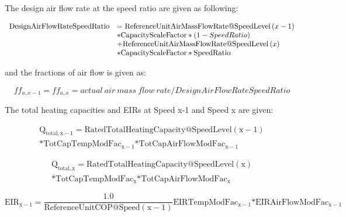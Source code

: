 The design air flow rate at the speed ratio are given as following:

\begin{equation}
  \begin{array}{rl}
    \mathrm{DesignAirFlowRateSpeedRatio} &= \mathrm{ReferenceUnitAirMassFlowRate @ SpeedLevel} \left(x-1\right) \\
                                     &* \mathrm{CapacityScaleFactor} * \left(1 - SpeedRatio\right) \\
                                     &+ \mathrm{ReferenceUnitAirMassFlowRate @ SpeedLevel} \left(x\right) \\
                                     &* \mathrm{CapacityScaleFactor*SpeedRatio}
  \end{array}
\end{equation}

and the fractions of air flow is given as:

\begin{equation}
ff_{a,x-1} = ff_{a,x} = actual~air~mass~flow~rate/DesignAirFlowRateSpeedRatio
\end{equation}

The total heating capacities and EIRs at Speed x-1 and Speed x are given:

\begin{equation}
\begin{split}
{{\mathrm{Q}}_{{\mathrm{total}},{\mathrm{x}} - 1}} = {\mathrm{RatedTotalHeatingCapacity}}@{\mathrm{SpeedLevel}}\left( {{\mathrm{x}} - 1} \right) \\
{\mathrm{*TotCapTempModFa}}{{\mathrm{c}}_{{\mathrm{x}} - 1}} {\mathrm{*TotCapAirFlowModFa}}{{\mathrm{c}}_{{\mathrm{x}} - 1}}
\end{split}
\end{equation}

\begin{equation}
\begin{split}
{{\mathrm{Q}}_{{\mathrm{total}},{\mathrm{x}}}} = {\mathrm{RatedTotalHeatingCapacity}}@{\mathrm{SpeedLevel}}\left( {\mathrm{x}} \right) \\
{\mathrm{*TotCapTempModFa}}{{\mathrm{c}}_{\mathrm{x}}} {\mathrm{*TotCapAirFlowModFa}}{{\mathrm{c}}_{\mathrm{x}}}
\end{split}
\end{equation}

\begin{equation}
{\mathrm{EI}}{{\mathrm{R}}_{{\mathrm{x}} - 1}} = \frac{{1.0}}{{{\mathrm{ReferenceUnitCOP}}@{\mathrm{Speed}}({\mathrm{x}} - 1)}}{\mathrm{EIRTempModFa}}{{\mathrm{c}}_{{\mathrm{x}} - 1}}{\mathrm{*EIRAirFlowModFa}}{{\mathrm{c}}_{{\mathrm{x}} - 1}}
\end{equation}

